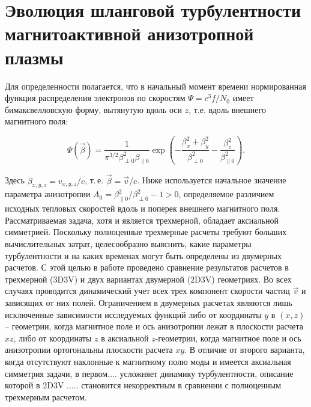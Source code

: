 \chapter{Эволюция шланговой турбулентности магнитоактивной анизотропной плазмы 
}\label{ch:ch4}


Для определенности полагается, что в начальный момент времени нормированная функция распределения электронов по скоростям $\Psi = c^3f/N_0$ имеет бимаксвелловскую форму, вытянутую вдоль оси $z$, т.е. вдоль внешнего магнитного поля:


\begin{equation}
\label{bimax}
\Psi(\vec{\beta})=\dfrac{1}{\pi^{3/2}\beta_{\perp 0}^2 \beta_{\| 0} } \exp\left(-\dfrac{\beta_x^2+\beta_y^2}{\beta_{\perp 0}^2}-\dfrac{\beta_z^2}{\beta_{\| 0}^2}\right).
\end{equation}

Здесь $\beta_{x,y,z}={v_{x,y,z}}/{c}$, т.\,е. $\vec{\beta}=\vec{v}/{c}$. Ниже используется начальное значение параметра анизотропии $A_0={\beta^2_{\| 0}}/{\beta^2_{\perp 0}}-1 > 0$, определяемое различием исходных тепловых скоростей вдоль и поперек внешнего магнитного поля. Рассматриваемая задача, хотя и является трехмерной, обладает аксиальной симметрией. Поскольку полноценные трехмерные расчеты требуют больших вычислительных затрат, целесообразно выяснить, какие параметры турбулентности и на каких временах могут быть определены из двумерных расчетов. С этой целью в работе проведено сравнение результатов расчетов в трехмерной (3D3V) и двух вариантах двумерной (2D3V) геометриях. Во всех случаях проводится динамический учет всех трех компонент скорости частиц $\vec{v}$ и зависящих от них полей.  Ограничением в двумерных расчетах являются лишь исключенные зависимости исследуемых функций либо от координаты $y$  в $(x,z)$ -- геометрии, когда магнитное поле и ось анизотропии лежат в плоскости расчета $xz$, либо от координаты $z$ в аксиальной $z$-геометрии, когда магнитное поле и ось анизотропии ортогональны плоскости расчета $xy$.  В отличие от второго варианта, когда отсутствуют наклонные к магнитному полю моды и имеется аксиальная симметрия задачи, в первом.... усложняет динамику турбулентности, описание которой в 2D3V ..... становится некорректным в сравнении с полноценным трехмерным расчетом.
 
